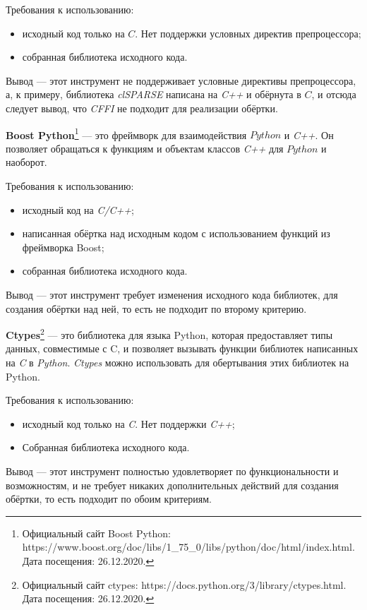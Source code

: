 \documentclass[14pt]{matmex-diploma}
\begin{document}
Требования к использованию:
\begin{itemize}
    \item исходный код только на $C$. Нет поддержки условных директив препроцессора;
    \item собранная библиотека исходного кода.
\end{itemize}

Вывод ---  этот инструмент не поддерживает условные директивы препроцессора, а, к примеру, библиотека \textit{clSPARSE}
написана на \textit{C++} и обёрнута в $C$, и отсюда следует вывод, что \textit{CFFI} не подходит для реализации обёртки.

\textbf{Boost Python}\footnote{
Официальный сайт Boost Python: https://www.boost.org/doc/libs/1\_75\_0/libs/python/doc/html/index.html.
Дата посещения: 26.12.2020.}
--- 
это фреймворк для взаимодействия $Python$ и \textit{C++}.
Он позволяет обращаться к функциям и объектам классов \textit{C++} для $Python$ и наоборот.

Требования к использованию:
\begin{itemize}
    \item исходный код на \textit{C/C++};
    \item написанная обёртка над исходным кодом с использованием функций из фреймворка Boost;
    \item собранная библиотека исходного кода.
\end{itemize}

Вывод ---  этот инструмент требует изменения исходного кода библиотек, для создания обёртки над ней,
то есть не подходит по второму критерию.

\textbf{Ctypes}\footnote{
Официальный сайт ctypes: https://docs.python.org/3/library/ctypes.html.
Дата посещения: 26.12.2020.}
--- 
это библиотека для языка Python, которая предоставляет типы данных, совместимые с C,
и позволяет вызывать функции библиотек написанных на \textit{C} в \textit{Python}.
\textit{Ctypes} можно использовать для обертывания этих библиотек на Python.

Требования к использованию:
\begin{itemize}
    \item исходный код только на \textit{C}. Нет поддержки \textit{C++};
    \item Собранная библиотека исходного кода.
\end{itemize}

Вывод --- этот инструмент
полностью удовлетворяет по функциональности и возможностям, и не
требует никаких дополнительных действий для создания обёртки, то есть подходит по обоим критериям.
\end{document}
